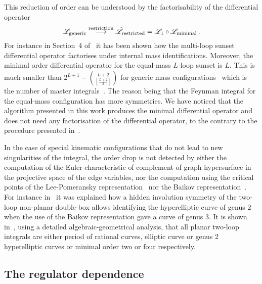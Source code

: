 \documentclass[a4paper,12pt]{article}
\numberwithin{equation}{section}
\numberwithin{figure}{section}
\begin{document}
This reduction of order can be
understood by the factorisability of the differential operator
\begin{equation}
  \mathscr{L}_{\rm generic} \stackrel{\rm restriction}{\longrightarrow}
  \hat{\mathscr{L}}_{\rm restricted}   = \mathscr{L}_1 \circ\mathscr{L}_{\rm minimal} \,.
\end{equation}
For instance in Section~4 of~\cite{Lairez:2022zkj} it has been shown
how the multi-loop sunset differential operator factorises under
internal mass identifications. Moreover,
the minimal order differential operator for the equal-mass $L$-loop sunset is $L$. This is much smaller than 
$2^{L+1}-\binom{L+2}{\left\lfloor \frac{L+2}{2}\right\rfloor }$ for generic
mass configurations~\cite{Lairez:2022zkj} which is the number of
master integrals~\cite{Bitoun:2017nre}.
The reason being that the Feynman integral for the equal-mass
configuration has more symmetries.  
We have noticed that the algorithm presented in this work produces 
the minimal  differential operator and does not need any factorisation
of the differential operator, to the contrary to the procedure
presented in~\cite{Pogel:2022vat}. 
%

In the case of special kinematic configurations that do not lead
to new singularities of the integral,  the order drop is not detected by  either the
computation of the Euler characteristic of complement of graph
hypersurface in the projective space of the edge variables, nor the
computation using the critical points of the
Lee-Pomeransky representation~\cite{Lee:2013hzt,Agostini:2022cgv,Fevola:2023kaw}   nor the
Baikov
representation~\cite{Frellesvig:2017aai,Frellesvig:2019uqt,Cacciatori:2021nli}.
For instance in~\cite{Marzucca:2023gto} it was explained how a hidden involution symmetry of the
two-loop non-planar double-box allows identifying the hyperelliptic
curve of genus 2 when the use of the Baikov representation gave a
curve of genus 3.
It is shown in~\cite{Doran:2023yzu}, using
a detailed  algebraic-geometrical analysis, that all planar two-loop
integrals are either period of rational curves, elliptic curve or genus
2 hyperelliptic curves or minimal order two or four respectively.

\subsection{The regulator dependence}
\label{sec:epsilon-dependence}
\end{document}
